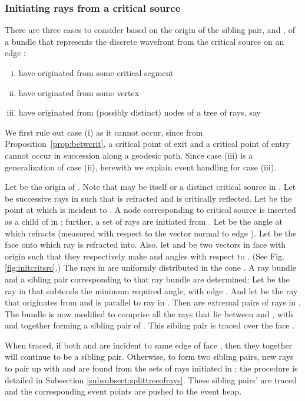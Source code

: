 \documentclass[11pt]{article}
\begin{document}
\subsubsection{Initiating rays from a critical source}
\label{subsect:initrayscritsrc}

There are three cases to consider based on the origin of the sibling pair,  and , of a bundle  that represents  the discrete wavefront from the critical source  on an edge :

\begin{enumerate}[(i)]
\item  have originated from some critical segment
\item  have originated from some vertex
\item  have originated from (possibly distinct) nodes of a tree of rays, say 
\end{enumerate}

We first rule out case (i) as it  cannot occur, since from  Proposition~\ref{prop:betwcrit}, 
a critical point of exit and a critical point of entry cannot occur in succession along a geodesic path.
Since case (iii) is a generalization of case (ii), herewith we explain event handling for case (iii).

Let  be the origin of .
Note that  may be  itself or a distinct critical source in .
Let  be successive rays in  such that  is refracted and  is critically reflected.
Let  be the point at which  is incident to .
A node corresponding to critical source  is inserted as a child of  in ; 
further, a set  of rays are initiated from . 
Let  be the angle at which  refracts (measured with respect to the vector  normal to edge ).
Let  be the face  onto which ray  is refracted into.
Also, let  and  be two vectors in face  with origin  such that they respectively make  and  angles with respect to . 
(See Fig. \ref{fig:initcritsrc}.)
The rays in  are uniformly distributed in the cone .
A ray bundle and a sibling pair corresponding to that ray bundle are determined:
Let  be the ray in  that subtends the minimum required angle,  with edge .
And let  be the ray that originates from  and is parallel to ray  in . 
Then  are extremal pairs of rays in .
The bundle  is now modified to  comprise all the rays that lie between  and , with  and  together forming a sibling pair of .
This sibling pair is traced over the face .

When traced, if both  and  are incident to same edge of face , then they together will continue to be a sibling pair.
Otherwise, to form two sibling pairs, new rays to pair up with  and  are found from the sets of rays initiated in ; the procedure is detailed in Subsection \ref{subsubsect:splittreeofrays}.
These sibling pairs' are traced and the corresponding event points are pushed to the event heap.
\end{document}
